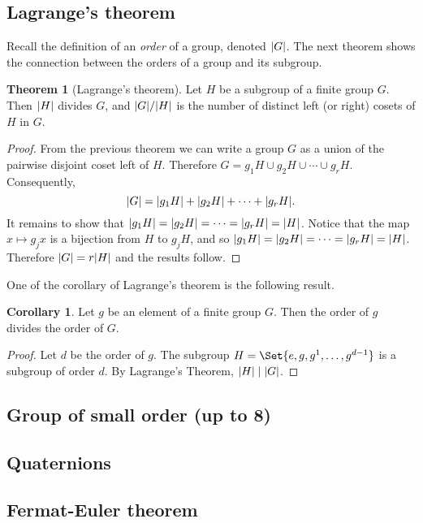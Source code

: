 \documentclass[12pt]{book}
\theoremstyle{definition}
\newtheorem{theorem}{Theorem}[chapter]
\newtheorem{corollary}{Corollary}[section]
\theoremstyle{remark}
\DeclarePairedDelimiter\abs{\lvert}{\rvert}
\begin{document}
			\subsection{Lagrange’s theorem}
			Recall the definition of an \textit{order} of a group, denoted $\abs{G}$. The next theorem shows the connection between the orders of a group and its subgroup.
				\begin{theorem}[Lagrange's theorem]
					Let $H$ be a subgroup of a finite group $G$. Then $\abs{H}$ divides $G$, and $\abs{G}/\abs{H}$ is the number of distinct left (or right) cosets of $H$ in $G$.
				\end{theorem}
				\begin{proof}
					From the previous theorem we can write a group $G$ as a union of the pairwise disjoint coset left of $H$. Therefore $G = g_1H \cup g_2 H \cup \cdots \cup g_r H$. Consequently,
					\begin{equation*}
						\abs{G} = \abs{g_1 H} + \abs{g_2 H} + \cdots + \abs{g_r H}.
					\end{equation*}
					It remains to show that $\abs{g_1 H} = \abs{g_2 H} = \cdots = \abs{g_r H} = \abs{H}$. Notice that the map $x \mapsto g_j x$ is a bijection from $H$ to $g_j H$, and so $\abs{g_1 H} = \abs{g_2 H} = \cdots = \abs{g_r H} = \abs{H}$. Therefore $\abs{G} = r\abs{H}$ and the results follow.
				\end{proof}
			
			One of the corollary of Lagrange's theorem is the following result.
			\begin{corollary}
					Let $g$ be an element of a finite group $G$. Then the order of $g$ divides the order of $G$.
			\end{corollary}
			\begin{proof}
				Let $d$ be the order of $g$. The subgroup $H = \Set{e, g, g^1, \ldots, g^{d-1}}$ is a subgroup of order $d$. By Lagrange's Theorem, $\abs H \mid \abs G$.
			\end{proof}
			\subsection{Group of small order (up to 8)}
			
			\subsection{Quaternions}
			
			\subsection{Fermat-Euler theorem}
			
\end{document}
